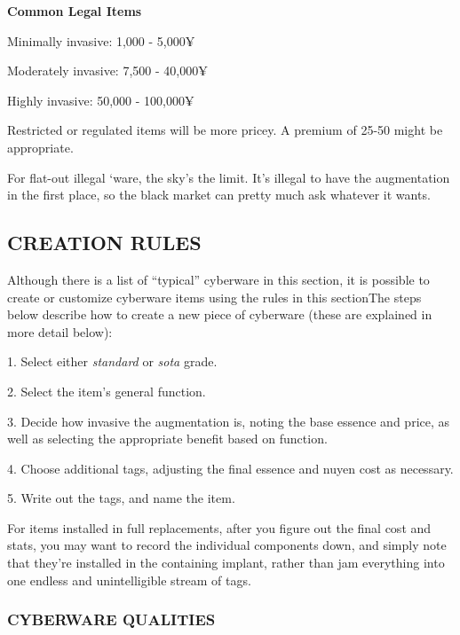 \documentclass[oneside,10pt]{article}
\begin{document}
\begin{multicols}{2}
\textbf{Common Legal Items}

\begin{adjustwidth*}{.5cm}{.5cm}


\tcirc{} Minimally invasive: 1,000 - 5,000¥

\tcirc{} Moderately invasive: 7,500 - 40,000¥

\tcirc{} Highly invasive: 50,000 - 100,000¥
\end{adjustwidth*}
Restricted or regulated items will be more pricey. A premium
of 25-50%
might be appropriate.

For flat-out illegal ‘ware, the sky’s the limit. It’s illegal to have
the augmentation in the first place, so the black market can
pretty much ask whatever it wants.

\subsection{CREATION RULES}
Although there is a list of “typical” cyberware in this section,
it is possible to create or customize cyberware items using
the rules in this sectionThe steps below describe how to create a new piece of cyberware (these are explained in more
detail below):

\begin{adjustwidth*}{.5cm}{.5cm}


1.	Select either \textit{standard} or \textit{sota} grade.

2.	Select the item’s general function.

3.	Decide how invasive the augmentation is, noting the
base essence and price, as well as selecting the appropriate benefit based on function.

4.	Choose additional tags, adjusting the final essence and
nuyen cost as necessary.

5.	Write out the tags, and name the item.
\end{adjustwidth*}
For items installed in full replacements, after you figure out
the final cost and stats, you may want to record the individual
components down, and simply note that they’re installed in
the containing implant, rather than jam everything into one
endless and unintelligible stream of tags.

\subsubsection{CYBERWARE QUALITIES}


\end{multicols}
\end{document}

